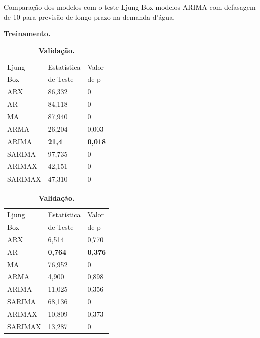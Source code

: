 \begin{table}[H]
	\centering		
	\caption{Comparação dos modelos com o teste Ljung Box modelos ARIMA com defasagem de 10 para previsão de longo prazo na demanda d'água.}
	
	\begin{subtable}{0.49\linewidth}
		\centering
		\caption{\textbf{Treinamento.}} \label{tb:lbtrn}
		\begin{tabular}{@{}lll@{}}
			\toprule
			Ljung  & Estatística  & Valor \\
			Box & de Teste& de p\\\midrule
			ARX & 86,332 & 0           \\
			AR  & 84,118 & 0            \\
			MA  & 87,940 & 0             \\
			ARMA & 26,204 & 0,003         \\
			ARIMA & \textbf{21,4} &\textbf{0,018}  \\
			SARIMA & 97,735 & 0 \\
			ARIMAX & 42,151 & 0   \\
			SARIMAX  & 47,310 & 0                    \\ \bottomrule
		\end{tabular}
	\end{subtable}
	\hfill
	\begin{subtable}{0.49\linewidth}
		\centering
		\caption{\textbf{Validação.}} \label{tb:lbvld}
		\begin{tabular}{@{}lll@{}}
			\toprule
			Ljung  & Estatística  & Valor \\
			Box & de Teste& de p\\\midrule
			ARX       & 6,514                         & 0,770               \\
			AR        & \textbf{0,764}              & \textbf{0,376}     \\
			MA        & 76,952                        & 0                   \\
			ARMA      & 4,900                         & 0,898               \\
			ARIMA     & 11,025                        & 0,356               \\
			SARIMA    & 68,136                        & 0                   \\
			ARIMAX    & 10,809                        & 0,373               \\
			SARIMAX   & 13,287                        & 0                   \\ \bottomrule
		\end{tabular}
	\end{subtable}
			

\end{table}
